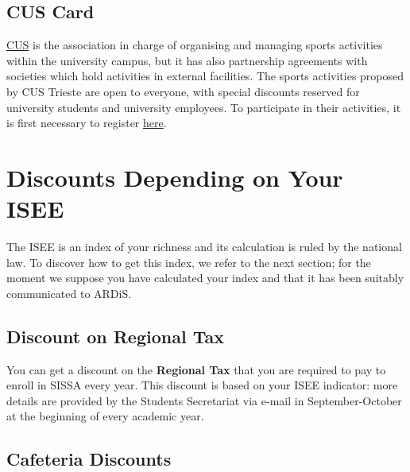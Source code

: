 \documentclass{sissavademecum}
\begin{document}
\subsection{CUS Card}

\href{https://www.cus.units.it/}{CUS} is  the association in charge of organising and managing sports activities within the university campus, but it has also partnership agreements with societies which hold activities in external facilities. The sports activities proposed by CUS Trieste are open to everyone, with special discounts reserved for university students and university employees. To participate in their activities, it is first necessary to register  \href{https://www.cus.units.it/iscrizioni}{here}.

\vspace{-0.4cm}


\section{Discounts Depending on Your ISEE}

The ISEE is an index of your richness and its calculation is ruled by the national law. To discover how to get this index, we refer to the next section; for the moment we suppose you have calculated your index and that it has been suitably communicated to ARDiS. 


\subsection{Discount on Regional Tax}

You can get a discount on the \textbf{Regional Tax} that you are required to pay to enroll in SISSA every year. This discount is based on your ISEE indicator: more details are provided by the Students Secretariat via e-mail in September-October at the beginning of every academic year.


\subsection{Cafeteria Discounts}
\end{document}
